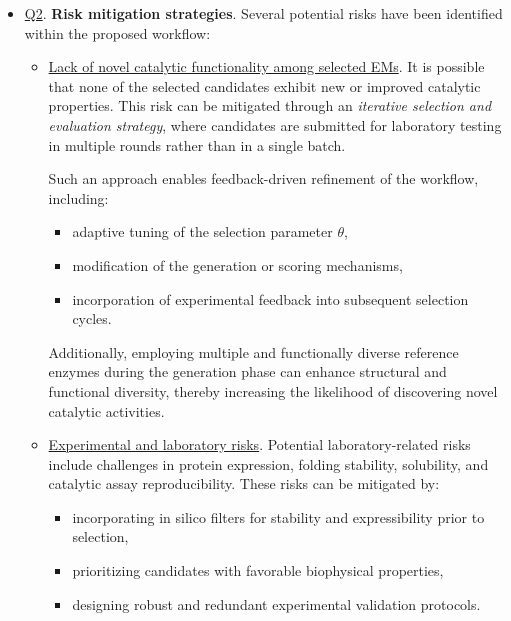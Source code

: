 \documentclass[runningheads]{llncs}
\begin{document}
\begin{itemize}
 	This hybrid deterministic–stochastic strategy enables controlled exploration of the search space while maintaining a core set of reliable candidates. In practice, several thousand EMs are expected to be selected for experimental validation through this mechanism.
 	
 	\vspace{0.3cm}
 	
 	\item \underline{Q2}. \textbf{Risk mitigation strategies}.  
 	Several potential risks have been identified within the proposed workflow:
 	
 	\begin{itemize}
 		
 		\item \underline{Lack of novel catalytic functionality among selected EMs}.  
 		It is possible that none of the selected candidates exhibit new or improved catalytic properties. This risk can be mitigated through an \emph{iterative selection and evaluation strategy}, where candidates are submitted for laboratory testing in multiple rounds rather than in a single batch.  
 		
 		Such an approach enables feedback-driven refinement of the workflow, including:
 		\begin{itemize}
 			\item adaptive tuning of the selection parameter $\theta$,
 			\item modification of the generation or scoring mechanisms,
 			\item incorporation of experimental feedback into subsequent selection cycles.
 		\end{itemize}
 		
 		Additionally, employing multiple and functionally diverse reference enzymes during the generation phase can enhance structural and functional diversity, thereby increasing the likelihood of discovering novel catalytic activities.
 		
 		\item \underline{Experimental and laboratory risks}.  
 		Potential laboratory-related risks include challenges in protein expression, folding stability, solubility, and catalytic assay reproducibility. These risks can be mitigated by:
 		\begin{itemize}
 			\item incorporating in silico filters for stability and expressibility prior to selection,
 			\item prioritizing candidates with favorable biophysical properties,
 			\item designing robust and redundant experimental validation protocols.
 		\end{itemize}
 		
 	\end{itemize}
 	
 \end{itemize}
\end{document}
